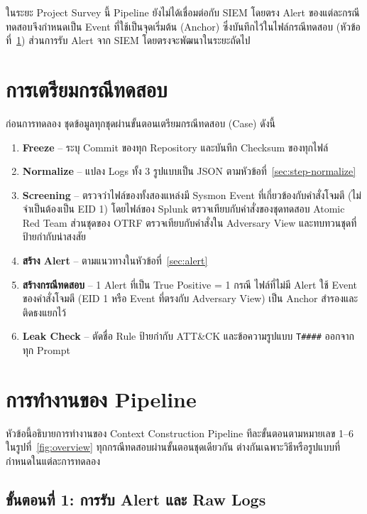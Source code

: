 ในระยะ Project Survey นี้ Pipeline ยังไม่ได้เชื่อมต่อกับ SIEM โดยตรง
Alert ของแต่ละกรณีทดสอบจึงกำหนดเป็น Event ที่ใช้เป็นจุดเริ่มต้น (Anchor) ซึ่งบันทึกไว้ในไฟล์กรณีทดสอบ
(หัวข้อที่~\ref{sec:case-prep}) ส่วนการรับ Alert จาก SIEM โดยตรงจะพัฒนาในระยะถัดไป

\section{การเตรียมกรณีทดสอบ}
\label{sec:case-prep}

ก่อนการทดลอง ชุดข้อมูลทุกชุดผ่านขั้นตอนเตรียมกรณีทดสอบ (Case) ดังนี้
\begin{enumerate}
  \item \textbf{Freeze} -- ระบุ Commit ของทุก Repository และบันทึก Checksum ของทุกไฟล์
  \item \textbf{Normalize} -- แปลง Logs ทั้ง 3 รูปแบบเป็น JSON ตามหัวข้อที่~\ref{sec:step-normalize}
  \item \textbf{Screening} -- ตรวจว่าไฟล์ของทั้งสองแหล่งมี Sysmon Event ที่เกี่ยวข้องกับคำสั่งโจมตี
        (ไม่จำเป็นต้องเป็น EID 1) โดยไฟล์ของ Splunk ตรวจเทียบกับคำสั่งของชุดทดสอบ Atomic Red Team
        ส่วนชุดของ OTRF ตรวจเทียบกับคำสั่งใน Adversary View และทบทวนชุดที่ป้ายกำกับน่าสงสัย
  \item \textbf{สร้าง Alert} -- ตามแนวทางในหัวข้อที่~\ref{sec:alert}
  \item \textbf{สร้างกรณีทดสอบ} -- 1 Alert ที่เป็น True Positive = 1 กรณี
        ไฟล์ที่ไม่มี Alert ใช้ Event ของคำสั่งโจมตี (EID 1 หรือ Event ที่ตรงกับ Adversary View) เป็น Anchor สำรองและติดธงแยกไว้
  \item \textbf{Leak Check} -- ตัดชื่อ Rule ป้ายกำกับ ATT\&CK และข้อความรูปแบบ \texttt{T\#\#\#\#} ออกจากทุก Prompt
\end{enumerate}

\section{การทำงานของ Pipeline}
\label{sec:pipeline}

หัวข้อนี้อธิบายการทำงานของ Context Construction Pipeline ทีละขั้นตอนตามหมายเลข 1--6 ในรูปที่~\ref{fig:overview}
ทุกกรณีทดสอบผ่านขั้นตอนชุดเดียวกัน ต่างกันเฉพาะวิธีหรือรูปแบบที่กำหนดในแต่ละการทดลอง

\subsection{ขั้นตอนที่ 1: การรับ Alert และ Raw Logs}
\label{sec:step-input}

